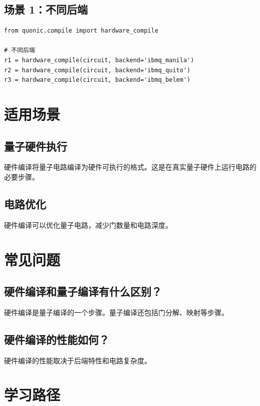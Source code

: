 \documentclass[12pt,a4paper]{article}
\begin{document}
\subsection{场景 1：不同后端}

\begin{verbatim}
from quonic.compile import hardware_compile

# 不同后端
r1 = hardware_compile(circuit, backend='ibmq_manila')
r2 = hardware_compile(circuit, backend='ibmq_quito')
r3 = hardware_compile(circuit, backend='ibmq_belem')
\end{verbatim}

\section{适用场景}

\subsection{量子硬件执行}

硬件编译将量子电路编译为硬件可执行的格式。这是在真实量子硬件上运行电路的必要步骤。

\subsection{电路优化}

硬件编译可以优化量子电路，减少门数量和电路深度。

\section{常见问题}

\subsection{硬件编译和量子编译有什么区别？}

硬件编译是量子编译的一个步骤。量子编译还包括门分解、映射等步骤。

\subsection{硬件编译的性能如何？}

硬件编译的性能取决于后端特性和电路复杂度。

\section{学习路径}
\end{document}
